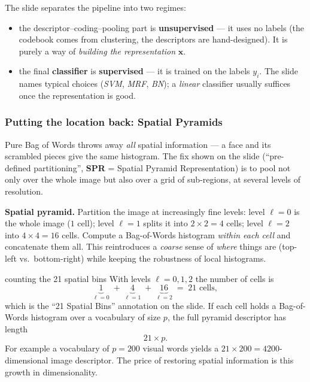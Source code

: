 \documentclass{report}
\newcommand{\xvec}{\mathbf{x}}
\begin{document}
The slide separates the pipeline into two regimes:
\begin{itemize}
\item the descriptor--coding--pooling part is \textbf{unsupervised} --- it uses
no labels (the codebook comes from clustering, the descriptors are
hand-designed). It is purely a way of \emph{building the representation} $\xvec$.
\item the final \textbf{classifier} is \textbf{supervised} --- it is trained on
the labels $y_i$. The slide names typical choices (\emph{SVM}, \emph{MRF},
\emph{BN}); a \emph{linear} classifier usually suffices once the representation
is good.
\end{itemize}

\subsubsection{Putting the location back: Spatial Pyramids}

Pure Bag of Words throws away \emph{all} spatial information --- a face and its
scrambled pieces give the same histogram. The fix shown on the slide
(``pre-defined partitioning'', \textbf{SPR} = Spatial Pyramid
Representation) is to pool not only over the whole image but also over a grid of
sub-regions, at several levels of resolution.

\begin{keybox}
\textbf{Spatial pyramid.} Partition the image at increasingly fine levels:
level $\ell=0$ is the whole image ($1$ cell); level $\ell=1$ splits it into
$2\times2=4$ cells; level $\ell=2$ into $4\times4=16$ cells. Compute a
Bag-of-Words histogram \emph{within each cell} and concatenate them all. This
reintroduces a \emph{coarse} sense of \emph{where} things are (top-left vs.\
bottom-right) while keeping the robustness of local histograms.
\end{keybox}

\begin{exbox}{counting the 21 spatial bins}
With levels $\ell = 0,1,2$ the number of cells is
\[
\underbrace{1}_{\ell=0}\;+\;\underbrace{4}_{\ell=1}\;+\;\underbrace{16}_{\ell=2}
\;=\; 21 \text{ cells},
\]
which is the ``21 Spatial Bins'' annotation on the slide. If each cell holds a
Bag-of-Words histogram over a vocabulary of size $p$, the full pyramid
descriptor has length
\[
21 \times p .
\]
For example a vocabulary of $p=200$ visual words yields a
$21 \times 200 = 4200$-dimensional image descriptor. The price of restoring
spatial information is this growth in dimensionality.
\end{exbox}
\end{document}
